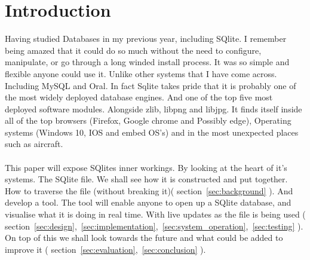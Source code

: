 \section{Introduction}
\label{sec:introduction}

Having studied Databases in my previous year, including SQlite. I remember being amazed that it could do so much without the need to configure, manipulate, or go through a long winded install process. It was so simple and flexible anyone could use it. Unlike other systems that I have come across. Including MySQL and Oral. In fact Sqlite takes pride that it is probably one of the most widely deployed database engines. And one of the top five most deployed software modules. Alongside zlib, libpng and libjpg. It finds itself inside all of the top browsers (Firefox, Google chrome and Possibly edge), Operating systems (Windows 10, IOS and embed OS's) and in the most unexpected places such as aircraft.
\\\\
This paper will expose SQlites inner workings. By looking at the heart of it's systems. The SQlite file. We shall see how it is constructed and put together. How to traverse the file (without breaking it)( section~\ref{sec:background} ). And develop a tool. The tool will enable anyone to open up a SQlite database, and visualise what it is doing in real time. With live updates as the file is being used ( section~\ref{sec:design},~\ref{sec:implementation},~\ref{sec:system_operation},~\ref{sec:testing} ). On top of this we shall look towards the future and what could be added to improve it ( section~\ref{sec:evaluation},~\ref{sec:conclusion} ). 